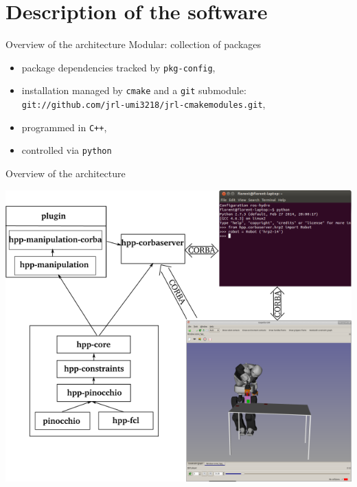\section {Description of the software}

%
%

\begin {frame} {Overview of the architecture}
  Modular: collection of packages
  \pause
  \begin{itemize}
    \item package dependencies tracked by \texttt{pkg-config},
      \pause
    \item installation managed by \texttt{cmake} and a \texttt{git}
      submodule: {\tiny\texttt{git://github.com/jrl-umi3218/jrl-cmakemodules.git}},
      \pause
    \item programmed in \texttt{C++},
      \pause
    \item controlled via \texttt{python}
  \end{itemize}
\end {frame}


%
%

\begin {frame} {Overview of the architecture}
\parbox {\linewidth} {
  \centerline {
    \includegraphics[width=.6\linewidth]{figures/archi-hpp.png}
  }
}
\end {frame}

%
%

